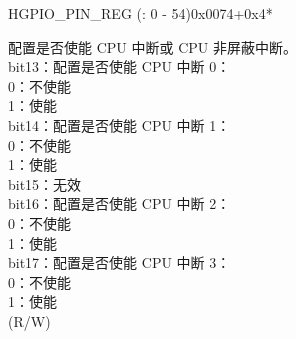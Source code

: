 \addtocounter{Regfloat}{-1}
\begin{register}{H}{GPIO\_PIN\_REG (: 0 - 54)}{0x0074+0x4*}
\begin{regdesc}\begin{reglist}
\item [接上页]
\label{fielddesc:GPIOPINNINTENA}\item [GPIO\_PIN\regindex{n}\_INT\_ENA] 配置是否使能 CPU 中断或 CPU 非屏蔽中断。\\
bit13：配置是否使能 CPU 中断 0：\\
0：不使能\\
1：使能\\
bit14：配置是否使能 CPU 中断 1：\\
0：不使能\\
1：使能\\
bit15：无效\\
bit16：配置是否使能 CPU 中断 2：\\
0：不使能\\
1：使能\\
bit17：配置是否使能 CPU 中断 3：\\
0：不使能\\
1：使能\\
(R/W)
\end{reglist}\end{regdesc}
\end{register}

